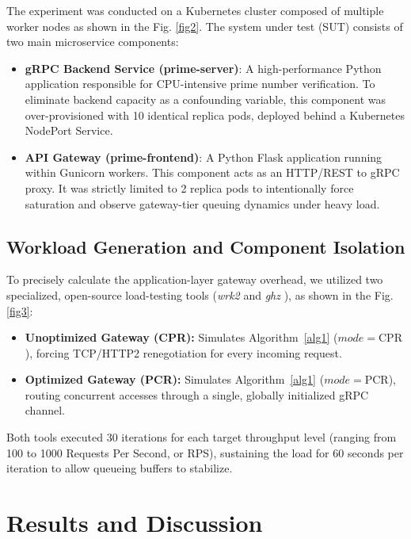 \documentclass{ieeeaccess}
\begin{document}
The experiment was conducted on a Kubernetes cluster composed of multiple worker nodes as shown in the Fig. \ref{fig2}. The system under test (SUT) consists of two main microservice components:

\begin{itemize}
    \item \textbf{gRPC Backend Service (prime-server)}: A high-performance Python application responsible for CPU-intensive prime number verification. To eliminate backend capacity as a confounding variable, this component was over-provisioned with 10 identical replica pods, deployed behind a Kubernetes NodePort Service.

    \item \textbf{API Gateway (prime-frontend)}: A Python Flask application running within Gunicorn workers. This component acts as an HTTP/REST to gRPC proxy. It was strictly limited to 2 replica pods to intentionally force saturation and observe gateway-tier queuing dynamics under heavy load. 
\end{itemize}

\subsection{Workload Generation and Component Isolation}
\label{4.2}


To precisely calculate the application-layer gateway overhead, we utilized two specialized, open-source load-testing tools (\textit{wrk2} \cite{wrk2} and \textit{ghz} \cite{ghz}), as shown in the Fig. \ref{fig3}:

\begin{itemize}
    \item \textbf{Unoptimized Gateway (CPR):} Simulates Algorithm~\ref{alg1} ($mode = \text{CPR}$), forcing TCP/HTTP2 renegotiation for every incoming request.
    \item \textbf{Optimized Gateway (PCR):} Simulates Algorithm~\ref{alg1} ($mode = \text{PCR}$), routing concurrent accesses through a single, globally initialized gRPC channel.
\end{itemize}


Both tools executed 30 iterations for each target throughput level (ranging from 100 to 1000 Requests Per Second, or RPS), sustaining the load for 60 seconds per iteration to allow queueing buffers to stabilize.

\section{Results and Discussion}
\label{sec5}
\end{document}
